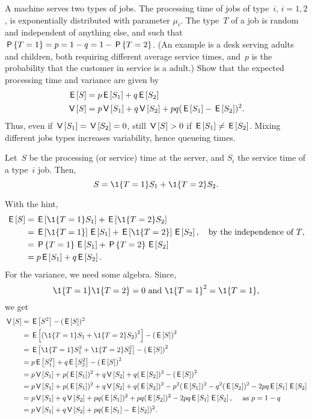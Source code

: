 \documentclass[stochastic-or.tex]{subfiles}
\begin{document}
\begin{exercise}\label{ex:49}
  A machine serves two types of jobs.
  The processing time of jobs of type~$i$, $i=1,2$, is exponentially distributed with parameter $\mu_i$.
  The type~$T$ of a job is random and independent of anything else, and such that $\P{T=1} = p = 1-q = 1-\P{T=2}$.
  (An example is a desk serving adults and children, both requiring different average service times, and~$p$ is the probability that the customer in service is a adult.)
  Show that the expected processing time and variance are given by
\begin{align*}
 \E S &= p \E{S_1} + q \E{S_2} \\
\V S &= p \V{S_1} + q \V{S_2} + pq(\E{S_1} - \E{S_2})^2.
 \end{align*}
Thus, even if $\V{S_1} = \V{S_2} = 0$, still $\V S > 0$ if $\E{S_1} \neq \E{S_2}$.
    Mixing different jobs types increases variability, hence queueing times.
\begin{hint}
 Let~$S$ be the processing (or service) time at the server, and
 $S_i$ the service time of a type~$i$ job. Then,
 \begin{equation*}
 S = \1{T=1} S_1 + \1{T=2} S_2.
 \end{equation*}
\end{hint}
\begin{solution}
With the hint,
\begin{align*}
 \E S
&= \E{\1{T=1} S_1} + \E{\1{T=2} S_2} \\
&= \E{\1{T=1}} \E{S_1} + \E{\1{T=2}} \E{S_2}, \quad \text{by the independence of~$T$}, \\
&= \P{T=1}\E{S_1} + \P{T=2} \E{S_2} \\
&= p \E{S_1} + q \E{S_2}.
\end{align*}
For the variance, we need some algebra. Since,
\begin{equation*}
\1{T=1}\1{T=2} = 0 \text{ and } \1{T=1}^2 = \1{T=1},
\end{equation*}
we get
\begin{align*}
 \V S
&= \E{S^2} - (\E S)^2 \\
&= \E{\left(\1{T=1} S_1 + \1{T=2} S_2\right)^2} - \left(\E{S}\right)^2 \\
&= \E{\1{T=1} S_1^2 + \1{T=2} S_2^2} - \left(\E S \right)^2 \\
&= p \E{S_1^2} + q \E{S_2^2} - \left(\E S \right)^2 \\
&= p \V{S_1} + p (\E{S_1})^2 + q \V{S_2} + q(\E{S_2})^2 - \left(\E S\right)^2 \\
&= p \V{S_1} + p (\E{S_1})^2 + q \V{S_2} + q(\E{S_2})^2 - p^2 (\E{S_1})^2 - q^2 (\E{S_2})^2 - 2pq \E{S_1}\E{S_2} \\
&= p \V{S_1} + q \V{S_2} + pq (\E{S_1})^2 +pq (\E{S_2})^2 - 2pq \E{S_1}\E{S_2}, \quad\text{ as } p = 1-q\\
&= p \V{S_1} + q \V{S_2} + pq(\E{S_1} - \E{S_2})^2.
\end{align*}
\end{solution}
\end{exercise}





\end{document}
